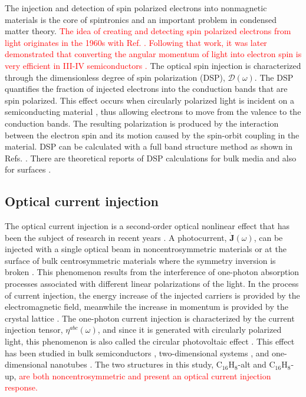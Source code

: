 \documentclass[pss]{wiley2sp} %
\begin{document}
The injection and detection of spin polarized electrons into nonmagnetic
materials is the core of spintronics \cite{vzuticRMP04,fertRMP08} and an
important problem in condensed matter theory. 
\textcolor{red}{
The idea of creating and detecting spin polarized electrons from light
originates in the 1960s with Ref. \cite{LampelPRL68}. Following that work, it
was later demonstrated that converting the angular momentum of light into
electron spin is very efficient in III-IV semiconductors
\cite{dyakonovOO84}. 
} 
The optical spin injection is characterized through the dimensionless degree
of spin polarization (DSP), $\boldsymbol{\mathcal{D}}(\omega)$. The DSP
quantifies the fraction of injected electrons into the conduction bands that
are spin polarized. This effect occurs when circularly polarized light is
incident on a semiconducting material \cite{dyakonovOO84}, thus allowing
electrons to move from the valence to the conduction bands. The resulting
polarization is produced by the interaction between the electron spin and its
motion caused by the spin-orbit coupling in the material. DSP can be
calculated with a full band structure method as shown in Refs.
\cite{nastosPRB07,cabellosPRB09}. There are theoretical reports of DSP
calculations for bulk media \cite{nastosPRB07,cabellosPRB09} and also for
surfaces \cite{mendozaPRB12,arzatePRB14}.


\subsection{Optical current injection}

The optical current injection is a second-order optical nonlinear effect that
has been the subject of research in recent years
\cite{arzatePRB14,bhatPRB05,fraserPRL99,hachePRL97,lamanAPL99}. A
photocurrent, $\mathbf{\dot{J}}(\omega)$, can be injected with a single
optical beam in noncentrosymmetric materials or at the surface of bulk
centrosymmetric materials where the symmetry inversion is broken
\cite{arzatePRB14}. This phenomenon results from the interference of one-photon 
absorption processes associated with different linear polarizations of
the light. In the process of current injection, the energy increase of the
injected carriers is provided by the electromagnetic field, meanwhile the
increase in momentum is provided by the crystal lattice \cite{arzatePRB14}.
The one-photon current injection is characterized by the current injection
tensor, $\eta^{abc}(\omega)$, and since it is generated with circularly
polarized light, this phenomenon is also called the circular photovoltaic
effect \cite{sturmanCRCP92}. This effect has been studied in bulk
semiconductors \cite{hachePRL97,sipePRB00}, two-dimensional systems
\cite{melePRB00,cabellosPRB11}, and one-dimensional nanotubes
\cite{melePRB00}. The two structures in this study, C$_{16}$H$_{8}$-alt and
C$_{16}$H$_{8}$-up,
\textcolor{red}{
are both noncentrosymmetric and present an optical current injection response.
}
\end{document}
